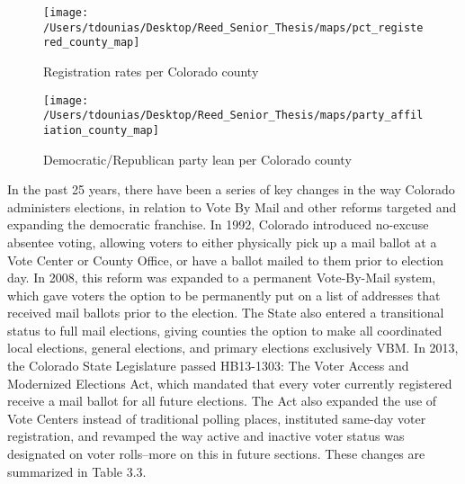 \documentclass[12pt,twoside]{reedthesis}
\begin{document}
  \begin{figure}
  
  {\centering \texttt{[image: /Users/tdounias/Desktop/Reed\_Senior\_Thesis/maps/pct\_registered\_county\_map]} 
  
  }
  
  \caption[Registration rates per Colorado county]{Registration rates per Colorado county}\label{fig:reg per county map}
  \end{figure}
  
  \begin{figure}
  
  {\centering \texttt{[image: /Users/tdounias/Desktop/Reed\_Senior\_Thesis/maps/party\_affiliation\_county\_map]} 
  
  }
  
  \caption[Democratic/Republican party lean per Colorado county]{Democratic/Republican party lean per Colorado county}\label{fig:party reg per county map}
  \end{figure}
  
  In the past 25 years, there have been a series of key changes in the way
  Colorado administers elections, in relation to Vote By Mail and other
  reforms targeted and expanding the democratic franchise. In 1992,
  Colorado introduced no-excuse absentee voting, allowing voters to either
  physically pick up a mail ballot at a Vote Center or County Office, or
  have a ballot mailed to them prior to election day. In 2008, this reform
  was expanded to a permanent Vote-By-Mail system, which gave voters the
  option to be permanently put on a list of addresses that received mail
  ballots prior to the election. The State also entered a transitional
  status to full mail elections, giving counties the option to make all
  coordinated local elections, general elections, and primary elections
  exclusively VBM. In 2013, the Colorado State Legislature passed
  HB13-1303: The Voter Access and Modernized Elections Act, which mandated
  that every voter currently registered receive a mail ballot for all
  future elections. The Act also expanded the use of Vote Centers instead
  of traditional polling places, instituted same-day voter registration,
  and revamped the way active and inactive voter status was designated on
  voter rolls--more on this in future sections. These changes are
  summarized in Table 3.3.
  
\end{document}
